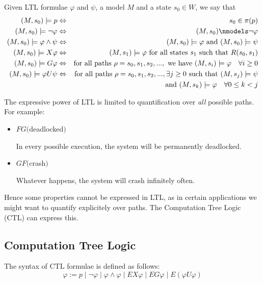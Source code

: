 \documentclass[11pt]{report}
\newenvironment{definition}[1][Definition]{\begin{trivlist}
\item[\hskip \labelsep {\bfseries #1}]}{\end{trivlist}}
\begin{document}
\begin{definition}
Given LTL formulae $\varphi$ and $\psi$, a model $M$ and a state $s_0 \in W$, we say that
\begin{eqnarray*}
(M, s_0) \models p &\Leftrightarrow& s_0 \in \pi(p) \\  
(M, s_0) \models \lnot \varphi &\Leftrightarrow& (M, s_0) \nmodels \lnot \varphi\\
(M, s_0) \models \varphi \land \psi &\Leftrightarrow& (M, s_0) \models \varphi \mbox{ and  } (M, s_0) \models \psi \\
(M, s_0) \models X\varphi &\Leftrightarrow& (M, s_1) \models \varphi \mbox{  for all states } s_1 \mbox{ such that } R(s_0, s_1)\\
(M, s_0) \models G\varphi &\Leftrightarrow& \mbox{for all paths } \rho = s_0, s_1, s_2, ... , \mbox{ we have } (M, s_i) \models \varphi \quad \forall i \geq 0 \\
(M, s_0) \models \varphi U\psi &\Leftrightarrow& \mbox{for all paths } \rho = s_0, s_1, s_2, ..., \exists j \geq 0 \mbox{ such that }  (M, s_j) \models \psi \\ && \mbox{ and }  (M, s_k) \models \varphi \quad \forall 0 \leq k < j
\end{eqnarray*}

\end{definition}
The expressive power of LTL is limited to quantification over \textit{all} possible paths. For example: 

\begin{itemize}
\item $FG($deadlocked$)$ 

In every possible execution, the system will be permanently deadlocked.


\item $GF($crash$)$

Whatever happens, the system will crash infinitely often.
\end{itemize}
Hence some properties cannot be expressed in LTL, as in certain applications we might want to quantify explicitely over paths. The Computation Tree Logic (CTL) can express this. 

\subsection{Computation Tree Logic} 

\begin{definition} 
The syntax of CTL formulae is defined as follows: 
$$ \varphi := p \mid \lnot \varphi \mid \varphi \land \varphi \mid EX\varphi \mid EG\varphi \mid E(\varphi U \varphi)$$
\end{definition}
\end{document}
